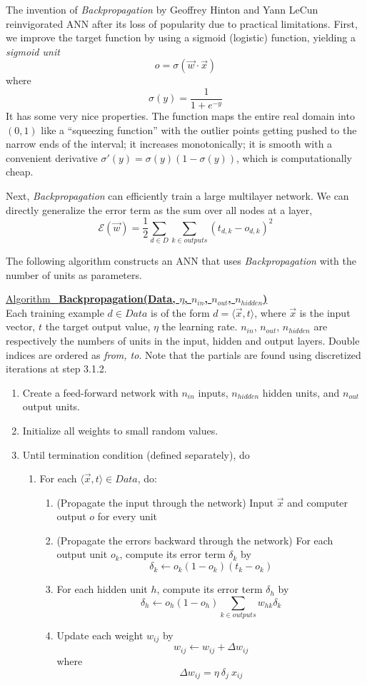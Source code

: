 \documentclass[12pt]{article}  %
\newcommand{\algtitle}[1]{\underline{Algorithm \ {\bf #1}} \vspace*{1mm}\\}
\begin{document}
The invention of {\em Backpropagation} by Geoffrey Hinton and Yann LeCun reinvigorated ANN after its loss of popularity due to practical limitations. First, we improve the target function by using a sigmoid (logistic) function, yielding a {\em sigmoid unit} $$o = \sigma (\vec{w} \cdot \vec{x})$$ where $$\sigma(y) = \frac{1}{1+e^{-y}}$$ It has some very nice properties. The function maps the entire real domain into $(0,1)$ like a ``squeezing function'' with the outlier points getting pushed to the narrow ends of the interval; it increases monotonically; it is smooth with a convenient derivative $\sigma'(y) = \sigma(y) (1 - \sigma(y))$, which is computationally cheap.

Next, {\em Backpropagation} can efficiently train a large multilayer network. We can directly generalize the error term as the sum over all nodes at a layer, $$\mathcal{E}(\vec{w}) = \frac{1}{2} \sum_{d \in D} \sum_{k \in outputs} (t_{d,k} - o_{d,k})^2$$

The following algorithm constructs an ANN that uses {\em Backpropagation} with the number of units as parameters.


\algtitle{Backpropagation(Data, $\eta$, $n_{in}$, $n_{out}$, $n_{hidden}$)}
Each training example $d \in Data$ is of the form $d = \langle \vec{x}, t \rangle$, where $\vec{x}$ is the input vector, $t$ the target output value, $\eta$ the learning rate. $n_{in}$, $n_{out}$, $n_{hidden}$ are respectively the numbers of units in the input, hidden and output layers. Double indices are ordered as {\em from, to}. Note that the partials are found using discretized iterations at step 3.1.2.

\begin{enumerate}
	\item Create a feed-forward network with $n_{in}$ inputs, $n_{hidden}$ hidden units, and $n_{out}$ output units.
	\item Initialize all weights to small random values.
	\item Until termination condition (defined separately), do
		\begin{enumerate}
			\item For each $\langle \vec{x}, t \rangle \in Data$, do:
			\begin{enumerate}
				\item (Propagate the input through the network) Input $\vec{x}$ and computer output $o$ for every unit
				\item (Propagate the errors backward through the network) For each output unit $o_k$, compute its error term $\delta_k$ by $$\delta_k \leftarrow o_k(1-o_k)(t_k-o_k)$$
				\item For each hidden unit $h$, compute its error term $\delta_h$ by $$\delta_h \leftarrow o_h(1-o_h)\sum_{k \in outputs}w_{hk}\delta_{k}$$
				\item Update each weight $w_{ij}$ by $$w_{ij} \leftarrow w_{ij} + \Delta w_{ij}$$ where $$\Delta w_{ij} = \eta \ \delta_j \ x_{ij}$$
			\end{enumerate}
		\end{enumerate}
\end{enumerate}
\end{document}
